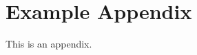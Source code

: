 \documentclass[11pt]{article}
\begin{document}









%


\appendix

\section{Example Appendix}
\label{sec:appendix}

This is an appendix.
\end{document}
